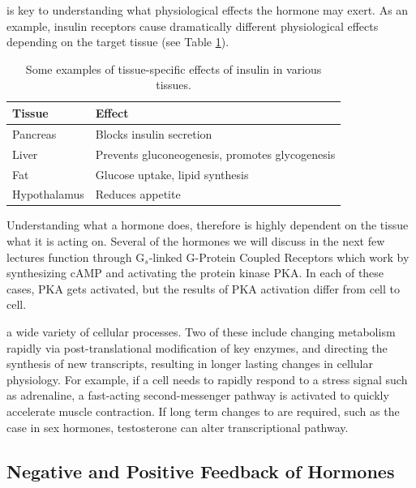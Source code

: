 \documentclass{tufte-handout}
\begin{document}
 is key to understanding what physiological effects the hormone may exert.  As an example, insulin receptors cause dramatically different physiological effects depending on the target tissue (see Table \ref{tab:insulin-tissue-roles}).

\begin{table}
  \centering
  \begin{tabular}{ll}
    \toprule
    Tissue & Effect \\
    \midrule
    Pancreas & Blocks insulin secretion \\
    Liver & Prevents gluconeogenesis, promotes glycogenesis\\
    Fat & Glucose uptake, lipid synthesis \\
    Hypothalamus & Reduces appetite \\
    \bottomrule
  \end{tabular}
  \caption{Some examples of tissue-specific effects of insulin in various tissues.}
  \label{tab:insulin-tissue-roles}
\end{table}

Understanding what a hormone does, therefore is highly dependent on the tissue what it is acting on.  Several of the hormones we will discuss in the next few lectures function through G$_{s}$-linked G-Protein Coupled Receptors which work by synthesizing cAMP and activating the protein kinase PKA.  In each of these cases, PKA gets activated, but the results of PKA activation differ from cell to cell.

 a wide variety of cellular processes.  Two of these include changing metabolism rapidly via post-translational modification of key enzymes, and directing the synthesis of new transcripts, resulting in longer lasting changes in cellular physiology.  For example, if a cell needs to rapidly respond to a stress signal such as adrenaline, a fast-acting second-messenger pathway is activated to quickly accelerate muscle contraction.  If long term changes to  are required, such as the case in sex hormones, testosterone can alter transcriptional pathway.


\subsection{Negative and Positive Feedback of Hormones}
\end{document}
